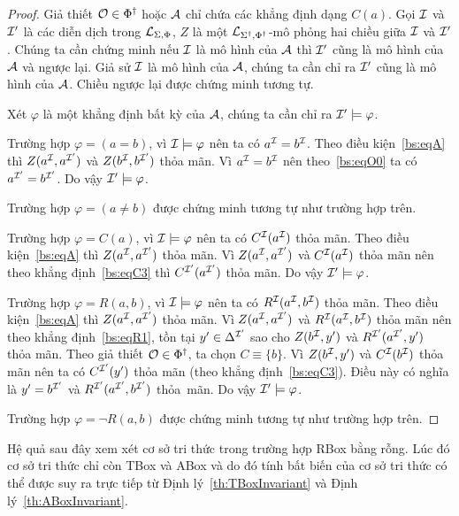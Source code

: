 \begin{proof}
	Giả thiết $\mathcal{O} \in \Phi^\dag$ hoặc $\mathcal{A}$ chỉ chứa các khẳng định dạng $C(a)$. Gọi $\mathcal{I}$ và $\mathcal{I}'$ là các diễn dịch trong $\mathcal{L}_{\Sigma,\Phi}$, $Z$ là một $\mathcal{L}_{\Sigma^\dag,\Phi^\dag}$-mô phỏng hai chiều giữa $\mathcal{I}$ và $\mathcal{I}'$. Chúng ta cần chứng minh nếu $\mathcal{I}$ là mô hình của $\mathcal{A}$ thì $\mathcal{I}'$ cũng là mô hình của $\mathcal{A}$ và ngược lại. Giả sử $\mathcal{I}$ là mô hình của $\mathcal{A}$, chúng ta cần chỉ ra $\mathcal{I}'$ cũng là mô hình của $\mathcal{A}$. Chiều ngược lại được chứng minh tương tự.
	
	Xét $\varphi$ là một khẳng định bất kỳ của $\mathcal{A}$, chúng ta cần chỉ ra $\mathcal{I}' \models \varphi$.
	
	\semiItem Trường hợp $\varphi = (a=b)$, vì $\mathcal{I} \models \varphi$ nên ta có $a^{\mathcal{I}} = b^{\mathcal{I}}$. Theo điều kiện~\eqref{bs:eqA} thì $Z(a^{\mathcal{I}}, a^{\mathcal{I}'})$ và $Z(b^{\mathcal{I}}, b^{\mathcal{I}'})$ thỏa mãn. Vì $a^{\mathcal{I}} = b^{\mathcal{I}}$ nên theo~\eqref{bs:eqO0} ta có $a^{\mathcal{I}'} = b^{\mathcal{I}'}$. Do vậy $\mathcal{I}' \models \varphi$.
	
	\semiItem Trường hợp $\varphi = (a\not=b)$ được chứng minh tương tự như trường hợp trên.
	
	\semiItem Trường hợp $\varphi = C(a)$, vì $\mathcal{I} \models \varphi$ nên ta có $C^{\mathcal{I}}(a^{\mathcal{I}})$ thỏa mãn. Theo điều kiện~\eqref{bs:eqA} thì $Z(a^{\mathcal{I}}, a^{\mathcal{I}'})$ thỏa mãn. Vì $Z(a^{\mathcal{I}}, a^{\mathcal{I}'})$ và $C^{\mathcal{I}}(a^{\mathcal{I}})$ thỏa mãn nên theo khẳng định~\eqref{bs:eqC3} thì $C^{\mathcal{I}'}(a^{\mathcal{I}'})$ thỏa mãn. Do vậy $\mathcal{I}' \models \varphi$.
	
	\semiItem Trường hợp $\varphi = R(a,b)$, vì $\mathcal{I} \models \varphi$ nên ta có $R^{\mathcal{I}}(a^{\mathcal{I}}, b^{\mathcal{I}})$ thỏa mãn. Theo điều kiện~\eqref{bs:eqA} thì $Z(a^{\mathcal{I}}, a^{\mathcal{I}'})$ thỏa mãn. Vì $Z(a^{\mathcal{I}}, a^{\mathcal{I}'})$ và $R^{\mathcal{I}}(a^{\mathcal{I}}, b^{\mathcal{I}})$ thỏa mãn nên theo khẳng định~\eqref{bs:eqR1}, tồn tại $y' \in \Delta^{\mathcal{I}'}$ sao cho $Z(b^{\mathcal{I}}, y')$ và $R^{\mathcal{I}'}(a^{\mathcal{I}'}, y')$ thỏa mãn. Theo giả thiết $\mathcal{O} \in \Phi^\dag$, ta chọn $C \equiv \{b\}$. Vì $Z(b^{\mathcal{I}}, y')$ và $C^{\mathcal{I}}(b^{\mathcal{I}})$ thỏa mãn nên ta có $C^{\mathcal{I}'}(y')$ thỏa mãn (theo khẳng định~\eqref{bs:eqC3}). Điều này có nghĩa là $y' = b^{\mathcal{I}'}$ và $R^{\mathcal{I}'}(a^{\mathcal{I}'},b^{\mathcal{I}'})$ thỏa~mãn. Do vậy $\mathcal{I}' \models \varphi$.
	
	\semiItem Trường hợp $\varphi = \neg R(a,b)$ được chứng minh tương tự như trường hợp trên.
\end{proof}

Hệ quả sau đây xem xét cơ sở tri thức trong trường hợp RBox bằng rỗng. Lúc đó cơ sở tri thức chỉ còn TBox và ABox và do đó tính bất biến của cơ sở tri thức có thể được suy ra trực tiếp từ Định lý~\ref{th:TBoxInvariant} và Định lý~\ref{th:ABoxInvariant}.

